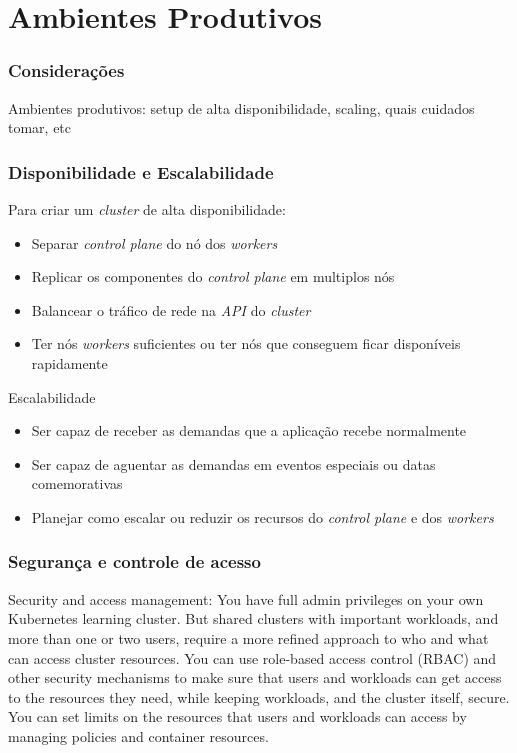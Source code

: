 \section{Ambientes Produtivos}

\begin{frame}
\frametitle{Considerações}
Ambientes produtivos: setup de alta disponibilidade, scaling, quais cuidados tomar, etc
\end{frame}

\begin{frame}
\frametitle{Disponibilidade e Escalabilidade}

Para criar um \textit{cluster} de alta disponibilidade:

\begin{itemize}
	\item Separar \textit{control plane} do nó dos \textit{workers}
	\item Replicar os componentes do \textit{control plane} em multiplos nós
	\item Balancear o tráfico de rede na \textit{API} do \textit{cluster}
	\item Ter nós \textit{workers} suficientes ou ter nós que conseguem ficar disponíveis rapidamente
\end{itemize}

Escalabilidade

\begin{itemize}
	\item Ser capaz de receber as demandas que a aplicação recebe normalmente
	\item Ser capaz de aguentar as demandas em eventos especiais ou datas comemorativas
	\item Planejar como escalar ou reduzir os recursos do \textit{control plane} e dos \textit{workers}
\end{itemize}
\end{frame}

\begin{frame}
\frametitle{Segurança e controle de acesso}
Security and access management: You have full admin privileges on your own Kubernetes learning cluster. But shared clusters with important workloads, and more than one or two users, require a more refined approach to who and what can access cluster resources. You can use role-based access control (RBAC) and other security mechanisms to make sure that users and workloads can get access to the resources they need, while keeping workloads, and the cluster itself, secure. You can set limits on the resources that users and workloads can access by managing policies and container resources.
\end{frame}

